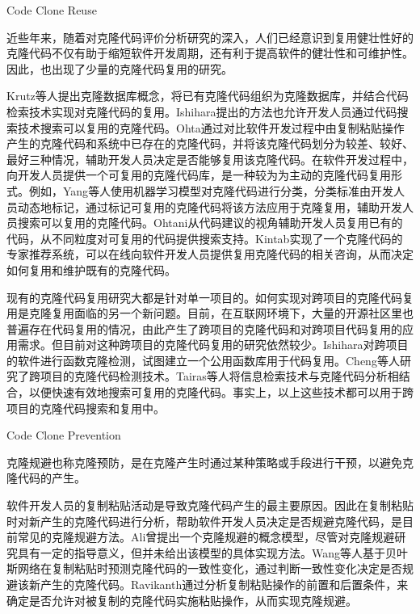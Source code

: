 {Code Clone Reuse}

近些年来，随着对克隆代码评价分析研究的深入，人们已经意识到复用健壮性好的克隆代码不仅有助于缩短软件开发周期，还有利于提高软件的健壮性和可维护性。因此，也出现了少量的克隆代码复用的研究。

Krutz等人提出克隆数据库概念，将已有克隆代码组织为克隆数据库，并结合代码检索技术实现对克隆代码的复用\cite{krutz2014code}。Ishihara提出的方法也允许开发人员通过代码搜索技术搜索可以复用的克隆代码\cite{ishihara2013reusing}。Ohta通过对比软件开发过程中由复制粘贴操作产生的克隆代码和系统中已存在的克隆代码，并将该克隆代码划分为较差、较好、最好三种情况，辅助开发人员决定是否能够复用该克隆代码\cite{ohta2015source}。在软件开发过程中，向开发人员提供一个可复用的克隆代码库，是一种较为为主动的克隆代码复用形式。例如，Yang\cite{yang2015classification}等人使用机器学习模型对克隆代码进行分类，分类标准由开发人员动态地标记，通过标记可复用的克隆代码将该方法应用于克隆复用，辅助开发人员搜索可以复用的克隆代码。Ohtani从代码建议的视角辅助开发人员复用已有的代码，从不同粒度对可复用的代码提供搜索支持\cite{ohtani2015level}。Kintab实现了一个克隆代码的专家推荐系统，可以在线向软件开发人员提供复用克隆代码的相关咨询，从而决定如何复用和维护既有的克隆代码\cite{kintab2014recommending}。

现有的克隆代码复用研究大都是针对单一项目的。如何实现对跨项目的克隆代码复用是克隆复用面临的另一个新问题。目前，在互联网环境下，大量的开源社区里也普遍存在代码复用的情况，由此产生了跨项目的克隆代码和对跨项目代码复用的应用需求。但目前对这种跨项目的克隆代码复用的研究依然较少。Ishihara对跨项目的软件进行函数克隆检测，试图建立一个公用函数库用于代码复用\cite{ishihara2012inter}。Cheng等人研究了跨项目的克隆代码检测技术\cite{cheng2016feasibility}。Tairas等人将信息检索技术与克隆代码分析相结合，以便快速有效地搜索可复用的克隆代码\cite{tairas2009information}。事实上，以上这些技术都可以用于跨项目的克隆代码搜索和复用中。

{Code Clone Prevention}

克隆规避也称克隆预防，是在克隆产生时通过某种策略或手段进行干预，以避免克隆代码的产生。

软件开发人员的复制粘贴活动是导致克隆代码产生的最主要原因。因此在复制粘贴时对新产生的克隆代码进行分析，帮助软件开发人员决定是否规避克隆代码，是目前常见的克隆规避方法。Ali曾提出一个克隆规避的概念模型\cite{ali2013enhancing}，尽管对克隆规避研究具有一定的指导意义，但并未给出该模型的具体实现方法。Wang等人基于贝叶斯网络在复制粘贴时预测克隆代码的一致性变化，通过判断一致性变化决定是否规避该新产生的克隆代码\cite{wang2012can}。Ravikanth通过分析复制粘贴操作的前置和后置条件，来确定是否允许对被复制的克隆代码实施粘贴操作，从而实现克隆规避\cite{venkatasubramanyam2012method}。

